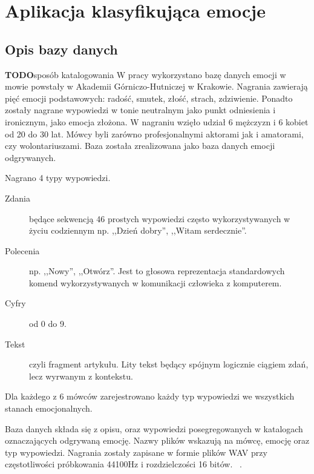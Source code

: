 \documentclass[a4paper,12pt,twoside,openany]{report}
\newcommand{\TODO}{\textbf{TODO}}
\begin{document}
\chapter{Aplikacja klasyfikująca emocje}
\section{Opis bazy danych}
\TODO{sposób katalogowania}
W pracy wykorzystano bazę danych emocji w mowie powstały w Akademii Górniczo-Hutniczej w Krakowie.
Nagrania zawierają pięć emocji podstawowych: radość, smutek, złość, strach, zdziwienie.
Ponadto zostały nagrane wypowiedzi w tonie neutralnym jako punkt odniesienia i ironicznym, jako emocja złożona.
W nagraniu wzięło udział 6 mężczyzn i 6 kobiet od 20 do 30 lat. 
Mówcy byli zarówno profesjonalnymi aktorami jak i amatorami, czy wolontariuszami.
Baza została zrealizowana jako baza danych emocji odgrywanych. 

Nagrano 4 typy wypowiedzi.
\begin{description}
	\item [Zdania] będące sekwencją 46 prostych wypowiedzi często wykorzystywanych w życiu codziennym 
		np. ,,Dzień dobry'', ,,Witam serdecznie''. 
	\item [Polecenia]  np. ,,Nowy'', ,,Otwórz''. 
		Jest to głosowa reprezentacja standardowych komend wykorzystywanych w komunikacji człowieka z komputerem.
	\item [Cyfry] od 0 do 9.
	\item [Tekst] czyli fragment artykułu. 
		Lity tekst będący spójnym logicznie ciągiem zdań, lecz wyrwanym z kontekstu.
\end{description}
Dla każdego z 6 mówców zarejestrowano każdy typ wypowiedzi we wszystkich stanach emocjonalnych.

Baza danych składa się z opisu, oraz wypowiedzi posegregowanych w katalogach oznaczających odgrywaną emocję.
Nazwy plików wskazują na mówcę, emocję oraz typ wypowiedzi.
Nagrania zostały zapisane w formie plików WAV przy częstotliwości próbkowania 44100Hz i rozdzielczości 16 bitów. ~\cite{Igras2009}.
\end{document}
